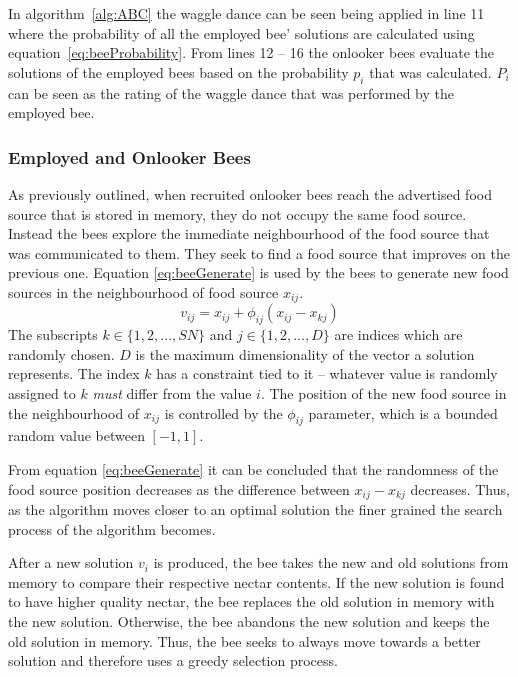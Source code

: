 In algorithm~\ref{alg:ABC} the waggle dance can be seen being applied in line 11 where the probability of all the employed bee' solutions are calculated using equation~\ref{eq:beeProbability}. From lines 12 -- 16 the onlooker bees evaluate the solutions of the employed bees based on the probability $p_i$ that was calculated. $P_i$ can be seen as the rating of the waggle dance that was performed by the employed bee.

\subsubsection{Employed and Onlooker Bees}
\label{sec:employonlookerbees}
As previously outlined, when recruited onlooker bees reach the advertised food source that is stored in memory, they do not occupy the same food source\cite{ABCCompareStudy,ABCNumericalOptimization}. Instead the bees explore the immediate neighbourhood of the food source that was communicated to them\cite{BeeJobShop,ABCFusionGrid,ABCReconfigDistro}. They seek to find a food source that improves on the previous one\cite{BeeJobShop,ABCNumericalOptimization}. Equation \ref{eq:beeGenerate} is used by the bees to generate new food sources in the neighbourhood of food source $x_{ij}$\cite{ABCCompareStudy,ABCFusionGrid}.
\begin{equation}
\label{eq:beeGenerate}
v_{ij} = x_{ij} + \phi_{ij}(x_{ij} - x_{kj})
\end{equation}
The subscripts $k \in \{1,2,\dots,SN\}$ and $j \in \{1,2,\dots,D\}$ are indices which are randomly chosen. $D$ is the maximum dimensionality of the vector a solution represents. The index $k$ has a constraint tied to it -- whatever value is randomly assigned to $k$ \emph{must} differ from the value $i$. The position of the new food source in the neighbourhood of $x_{ij}$ is controlled by the $\phi_{ij}$ parameter, which is a bounded random value between $[-1,1]$. 

From equation \ref{eq:beeGenerate} it can be concluded that the randomness of the food source position decreases as the difference between $x_{ij} - x_{kj}$ decreases. Thus, as the algorithm moves closer to an optimal solution the finer grained the search process of the algorithm becomes\cite{ABCCompareStudy,ABCNumericalOptimization,ABCImageEnhancement}.

After a new solution $v_i$ is produced, the bee takes the new and old solutions from memory to compare their respective nectar contents. If the new solution is found to have higher quality nectar, the bee replaces the old solution in memory with the new solution\cite{ABCCompareStudy,ABCReconfigDistro}. Otherwise, the bee abandons the new solution and keeps the old solution in memory\cite{ABCCompareStudy,ABCNumericalOptimization}. Thus, the bee seeks to always move towards a better solution and therefore uses a greedy selection process\cite{ABCLeafConstrained,ABCReconfigDistro}.

